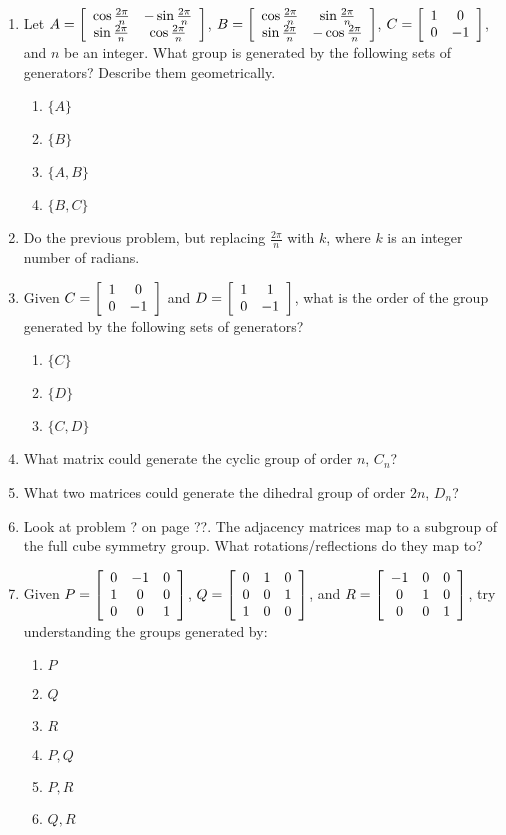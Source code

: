\documentclass[../gatm.tex]{subfiles}
\begin{document}
\begin{enumerate}
\item Let $A=\left[\begin{array}{cc} \cos\frac{2\pi}{n} & -\sin\frac{2\pi}{n} \\ \sin\frac{2\pi}{n} & \cos\frac{2\pi}{n} \end{array}\right]$, $B=\left[\begin{array}{cc} \cos\frac{2\pi}{n} & \sin\frac{2\pi}{n} \\ \sin\frac{2\pi}{n} & -\cos\frac{2\pi}{n} \end{array}\right]$, $C=\left[\begin{array}{cc} 1 & 0 \\ 0 & -1 \end{array}\right]$, and $n$ be an integer. What group is generated by the following sets of generators? Describe them geometrically.
\begin{multicols}{4}
\begin{enumerate}
\item $\{A\}$
\item $\{B\}$
\item $\{A,B\}$
\item $\{B,C\}$
\end{enumerate}
\end{multicols}
\item Do the previous problem, but replacing $\frac{2\pi}{n}$ with $k$, where $k$ is an integer number of radians.
\item Given $C=\left[\begin{array}{cc} 1 & 0 \\ 0 & -1 \end{array}\right]$ and $D=\left[\begin{array}{cc} 1 & 1 \\ 0 & -1 \end{array}\right]$, what is the order of the group generated by the following sets of generators?
\begin{multicols}{3}
\begin{enumerate}
\item $\{C\}$
\item $\{D\}$
\item $\{C,D\}$
\end{enumerate}
\end{multicols}
\item What matrix could generate the cyclic group of order $n$, $C_n$?
\item What two matrices could generate the dihedral group of order $2n$, $D_n$?
\item Look at problem ? on page ??. The adjacency matrices map to a subgroup of the full cube symmetry group. What rotations/reflections do they map to?
\item Given $P=\left[\begin{array}{ccc} 0 & -1 & 0 \\ 1 & 0 & 0 \\ 0 & 0 & 1 \end{array}\right]$, $Q=\left[\begin{array}{ccc} 0 & 1 & 0 \\ 0 & 0 & 1 \\ 1 & 0 & 0 \end{array}\right]$, and $R=\left[\begin{array}{ccc} -1 & 0 & 0 \\ 0 & 1 & 0 \\ 0 & 0 & 1 \end{array}\right]$, try understanding the groups generated by:
\begin{multicols}{4}
\begin{enumerate}
\item ${P}$
\item ${Q}$
\item ${R}$
\item ${P,Q}$
\item ${P,R}$
\item ${Q,R}$

\end{enumerate}
\end{multicols}
\end{enumerate}
\end{document}
